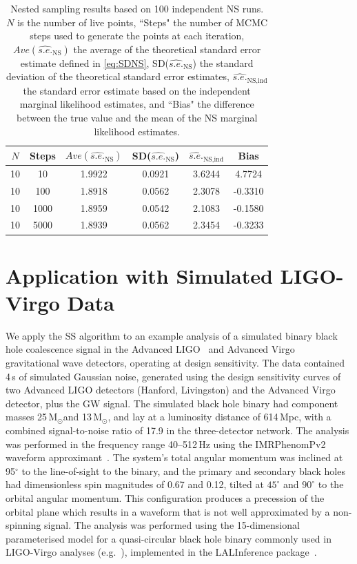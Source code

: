 \documentclass[aps,reprint,amsmath,amssymb,showpacs,showkeys]{revtex4-1}%
\newcommand{\Msun}{$\text{M}_{\odot}$}
\begin{document}
\begin{table}
	\caption{\label{tab:NSresults} Nested sampling results based on 100 independent NS runs.  $N$ is the number of live points, ``Steps" the number of MCMC steps used to generate the points at each iteration, $Ave(\widehat{s.e.}_{\text{NS}})$ the average of the theoretical standard error estimate defined in \eqref{eq:SDNS}, SD($\widehat{s.e.}_{\text{NS}}$) the standard deviation of the theoretical standard error estimates, $\widehat{s.e.}_{\text{NS,ind}}$ the standard error estimate based on the independent marginal likelihood estimates, and ``Bias" the difference between the true value and the mean of the NS marginal likelihood estimates.}
	\begin{ruledtabular}
		\begin{tabular}{cccccc}
			$N$ & Steps & $Ave(\widehat{s.e.}_{\text{NS}})$ & SD($\widehat{s.e.}_{\text{NS}}$) & $\widehat{s.e.}_{\text{NS,ind}}$  & Bias \\ \hline
			10&10&1.9922&0.0921&3.6244&4.7724\\
			10&100&1.8918&0.0562&2.3078&-0.3310\\
			10&1000&1.8959&0.0542&2.1083&-0.1580\\
			10&5000&1.8939&0.0562&2.3454&-0.3233\\
		\end{tabular}
	\end{ruledtabular}
\end{table}

\section{Application with Simulated LIGO-Virgo Data} \label{sec:LIGO}
We apply the SS algorithm to an example analysis of a simulated binary black hole
coalescence signal in the Advanced LIGO~\cite{0264-9381-32-7-074001} and Advanced
Virgo~\cite{0264-9381-32-2-024001}
gravitational wave detectors, operating at design sensitivity.
The data contained 4\,s of simulated Gaussian noise, generated using the design
sensitivity curves of two Advanced LIGO detectors (Hanford, Livingston) and the Advanced Virgo detector,
plus the GW signal. The simulated black hole binary had component masses
25\,\Msun and 13\,\Msun, and lay at a luminosity distance of 614\,Mpc, with a
combined signal-to-noise ratio of 17.9 in the three-detector network.
The analysis was performed in the frequency range 40--512\,Hz using the IMRPhenomPv2
waveform approximant~\cite{Hannam:2013oca}. The system's total angular momentum
was inclined at 95$^\circ$ to the line-of-sight to the binary, and the primary
and secondary black holes had dimensionless spin magnitudes of 0.67 and 0.12,
tilted at $45^\circ$ and $90^\circ$ to the orbital angular momentum. This
configuration produces a precession of the orbital plane which results in a
waveform that is not well approximated by a non-spinning signal. The analysis
was performed using the 15-dimensional parameterised model for a quasi-circular
black hole binary commonly used in LIGO-Virgo analyses (e.g.~\cite{PhysRevLett.116.241102,
O1BBH}), implemented in the LALInference package~\cite{Veitch:2015}.
\end{document}
